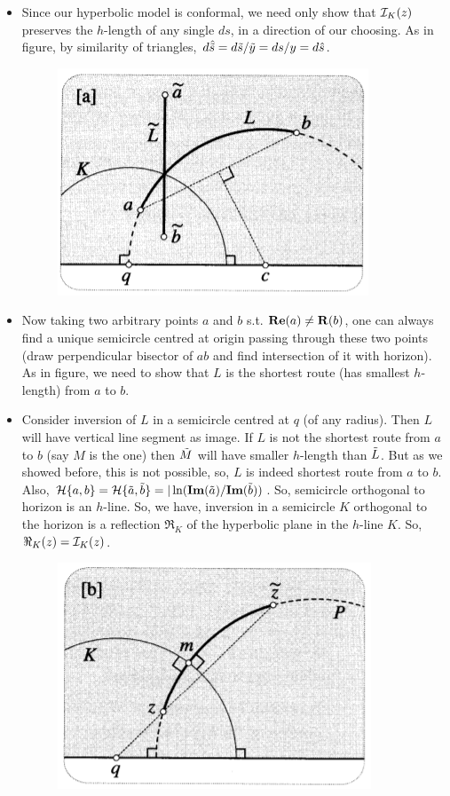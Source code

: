 \documentclass[12pt]{article}
\def\mc{\ensuremath\mathcal}
\def\mf{\ensuremath\mathbf}
\def\td{\ensuremath\tilde}
\begin{document}
\begin{itemize}
    \item Since our hyperbolic model is conformal, we need only show that $\mc{I}_{K}(z)$ preserves the $h$-length of any single $ds$, in a direction of our choosing. As in figure, by similarity of triangles, $d\hat{\td{s}} = d\td{s}/\td{y} = ds/y = d\hat{s}$.

    \begin{figure}[h!]
        \centering
        \includegraphics[scale=0.7]{fig_17}
        \label{fig_17}
    \end{figure}

    \item Now taking two arbitrary points $a$ and $b$ s.t. $\mf{Re}(a)\neq \mf{R}(b)$, one can always find a unique semicircle centred at origin passing through these two points (draw perpendicular bisector of $ab$ and find intersection of it with horizon). As in figure, we need to show that $L$ is the shortest route (has smallest $h$-length) from $a$ to $b$.

    \item Consider inversion of $L$ in a semicircle centred at $q$ (of any radius). Then $L$ will have vertical line segment as image. If $L$ is not the shortest route from $a$ to $b$ (say $M$ is the one) then $\td{M}$ will have smaller $h$-length than $\td{L}$. But as we showed before, this is not possible, so, $L$ is indeed shortest route from $a$ to $b$. Also, $\mc{H}\{a,b\} = \mc{H}\{\td{a},\td{b}\} = |\ln(\mf{Im}(\td{a})/\mf{Im}(\td{b}))$. So, semicircle orthogonal to horizon is an $h$-line. So, we have, inversion in a semicircle $K$ orthogonal to the horizon is a reflection $\Re_{K}$ of the hyperbolic plane in the $h$-line $K$. So, $\Re_{K}(z) = \mc{I}_{K}(z)$.

    \begin{figure}[h!]
        \centering
        \includegraphics[scale=0.7]{fig_18}
        \label{fig_18}
    \end{figure}


\end{itemize}
\end{document}
